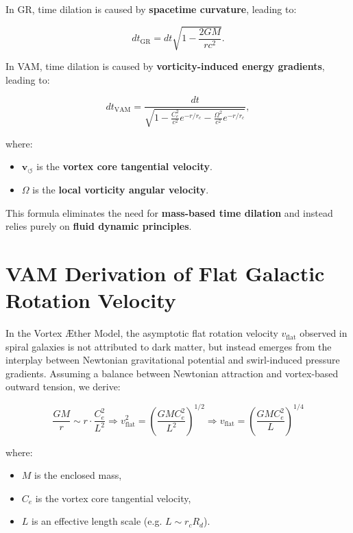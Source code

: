     In GR, time dilation is caused by \textbf{spacetime curvature}, leading to:

    \begin{equation*}
        dt_\text{GR} = dt \sqrt{1 - \frac{2GM}{rc^2}}.
    \end{equation*}

    In VAM, time dilation is caused by \textbf{vorticity-induced energy gradients}, leading to:

    \begin{equation*}
        dt_\text{VAM} = \frac{dt}{\sqrt{1 - \frac{C_e^2}{c^2} e^{-r/r_c} - \frac{\Omega^2}{c^2} e^{-r/r_c}}},
    \end{equation*}

    where:
    \begin{itemize}
        \item  \( \mathbf{v}_{\scriptscriptstyle\boldsymbol{\circlearrowleft}} \) is the \textbf{vortex core tangential velocity}.
        \item  \( \Omega \) is the \textbf{local vorticity angular velocity}.
    \end{itemize}


    This formula eliminates the need for \textbf{mass-based time dilation} and instead relies purely on \textbf{fluid dynamic principles}.


        \section*{VAM Derivation of Flat Galactic Rotation Velocity}

        In the Vortex \AE{}ther Model, the asymptotic flat rotation velocity $v_{\text{flat}}$ observed in spiral galaxies is not attributed to dark matter, but instead emerges from the interplay between Newtonian gravitational potential and swirl-induced pressure gradients. Assuming a balance between Newtonian attraction and vortex-based outward tension, we derive:

        \[
            \frac{G M}{r} \sim r \cdot \frac{C_e^2}{L^2} \Rightarrow
            v_{\text{flat}}^2 = \left( \frac{G M C_e^2}{L^2} \right)^{1/2} \Rightarrow
            \boxed{v_{\text{flat}} = \left( \frac{G M C_e^2}{L} \right)^{1/4}}
        \]

        where:
        \begin{itemize}
            \item  $M$ is the enclosed mass,
            \item  $C_e$ is the vortex core tangential velocity,
            \item  $L$ is an effective length scale (e.g. $L \sim r_c R_d$).
        \end{itemize}

